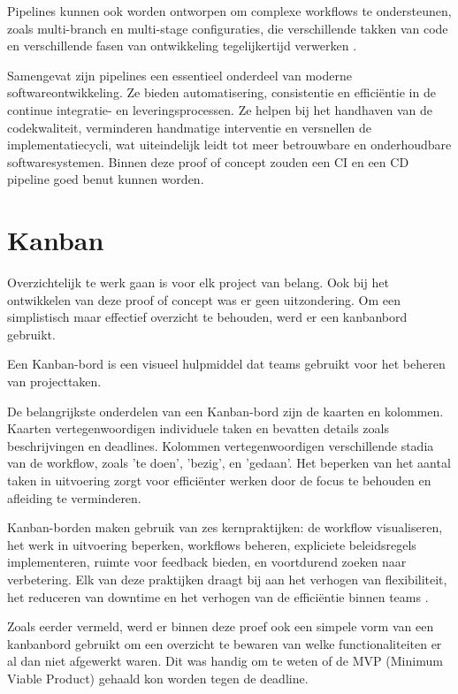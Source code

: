 Pipelines kunnen ook worden ontworpen om complexe workflows te ondersteunen, zoals multi-branch en multi-stage configuraties, die verschillende takken van code en verschillende fasen van ontwikkeling tegelijkertijd verwerken \autocite{Merode2023}.

Samengevat zijn pipelines een essentieel onderdeel van moderne softwareontwikkeling. Ze bieden automatisering, consistentie en efficiëntie in de continue integratie- en leveringsprocessen. Ze helpen bij het handhaven van de codekwaliteit, verminderen handmatige interventie en versnellen de implementatiecycli, wat uiteindelijk leidt tot meer betrouwbare en onderhoudbare softwaresystemen. 
Binnen deze proof of concept zouden een CI en een CD pipeline goed benut kunnen worden.

\section{Kanban}
Overzichtelijk te werk gaan is voor elk project van belang. Ook bij het ontwikkelen van deze proof of concept was er geen uitzondering. Om een simplistisch maar effectief overzicht te behouden, werd er een kanbanbord gebruikt.

Een Kanban-bord is een visueel hulpmiddel dat teams gebruikt voor het beheren van projecttaken.

De belangrijkste onderdelen van een Kanban-bord zijn de kaarten en kolommen. Kaarten vertegenwoordigen individuele taken en bevatten details zoals beschrijvingen en deadlines. Kolommen vertegenwoordigen verschillende stadia van de workflow, zoals 'te doen', 'bezig', en 'gedaan'. Het beperken van het aantal taken in uitvoering zorgt voor efficiënter werken door de focus te behouden en afleiding te verminderen.

Kanban-borden maken gebruik van zes kernpraktijken: de workflow visualiseren, het werk in uitvoering beperken, workflows beheren, expliciete beleidsregels implementeren, ruimte voor feedback bieden, en voortdurend zoeken naar verbetering. Elk van deze praktijken draagt bij aan het verhogen van flexibiliteit, het reduceren van downtime en het verhogen van de efficiëntie binnen teams \autocite{Hennigan2024}.

Zoals eerder vermeld, werd er binnen deze proef ook een simpele vorm van een kanbanbord gebruikt om een overzicht te bewaren van welke functionaliteiten er al dan niet afgewerkt waren. Dit was handig om te weten of de MVP (Minimum Viable Product) gehaald kon worden tegen de deadline.
